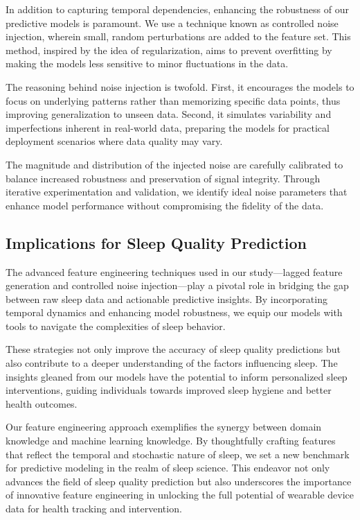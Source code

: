 \documentclass[10pt]{extarticle}
\begin{document}
In addition to capturing temporal dependencies, enhancing the robustness of our predictive models is paramount. We use a technique known as controlled noise injection, wherein small, random perturbations are added to the feature set. This method, inspired by the idea of regularization, aims to prevent overfitting by making the models less sensitive to minor fluctuations in the data.

The reasoning behind noise injection is twofold. First, it encourages the models to focus on underlying patterns rather than memorizing specific data points, thus improving generalization to unseen data. Second, it simulates variability and imperfections inherent in real-world data, preparing the models for practical deployment scenarios where data quality may vary.

The magnitude and distribution of the injected noise are carefully calibrated to balance increased robustness and preservation of signal integrity. Through iterative experimentation and validation, we identify ideal noise parameters that enhance model performance without compromising the fidelity of the data.

\subsection{Implications for Sleep Quality Prediction}

The advanced feature engineering techniques used in our study—lagged feature generation and controlled noise injection—play a pivotal role in bridging the gap between raw sleep data and actionable predictive insights. By incorporating temporal dynamics and enhancing model robustness, we equip our models with tools to navigate the complexities of sleep behavior.

These strategies not only improve the accuracy of sleep quality predictions but also contribute to a deeper understanding of the factors influencing sleep. The insights gleaned from our models have the potential to inform personalized sleep interventions, guiding individuals towards improved sleep hygiene and better health outcomes.

Our feature engineering approach exemplifies the synergy between domain knowledge and machine learning knowledge. By thoughtfully crafting features that reflect the temporal and stochastic nature of sleep, we set a new benchmark for predictive modeling in the realm of sleep science. This endeavor not only advances the field of sleep quality prediction but also underscores the importance of innovative feature engineering in unlocking the full potential of wearable device data for health tracking and intervention.
\end{document}
